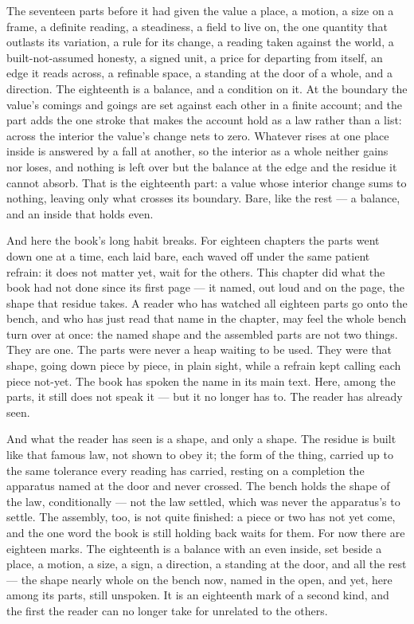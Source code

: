 The seventeen parts before it had given the value a place, a motion, a size on a frame, a definite reading, a steadiness, a field to live on, the one quantity that outlasts its variation, a rule for its change, a reading taken against the world, a built-not-assumed honesty, a signed unit, a price for departing from itself, an edge it reads across, a refinable space, a standing at the door of a whole, and a direction. The eighteenth is a balance, and a condition on it. At the boundary the value's comings and goings are set against each other in a finite account; and the part adds the one stroke that makes the account hold as a law rather than a list: across the interior the value's change nets to zero. Whatever rises at one place inside is answered by a fall at another, so the interior as a whole neither gains nor loses, and nothing is left over but the balance at the edge and the residue it cannot absorb. That is the eighteenth part: a value whose interior change sums to nothing, leaving only what crosses its boundary. Bare, like the rest --- a balance, and an inside that holds even.

And here the book's long habit breaks. For eighteen chapters the parts went down one at a time, each laid bare, each waved off under the same patient refrain: it does not matter yet, wait for the others. This chapter did what the book had not done since its first page --- it named, out loud and on the page, the shape that residue takes. A reader who has watched all eighteen parts go onto the bench, and who has just read that name in the chapter, may feel the whole bench turn over at once: the named shape and the assembled parts are not two things. They are one. The parts were never a heap waiting to be used. They were that shape, going down piece by piece, in plain sight, while a refrain kept calling each piece not-yet. The book has spoken the name in its main text. Here, among the parts, it still does not speak it --- but it no longer has to. The reader has already seen.

And what the reader has seen is a shape, and only a shape. The residue is built like that famous law, not shown to obey it; the form of the thing, carried up to the same tolerance every reading has carried, resting on a completion the apparatus named at the door and never crossed. The bench holds the shape of the law, conditionally --- not the law settled, which was never the apparatus's to settle. The assembly, too, is not quite finished: a piece or two has not yet come, and the one word the book is still holding back waits for them. For now there are eighteen marks. The eighteenth is a balance with an even inside, set beside a place, a motion, a size, a sign, a direction, a standing at the door, and all the rest --- the shape nearly whole on the bench now, named in the open, and yet, here among its parts, still unspoken. It is an eighteenth mark of a second kind, and the first the reader can no longer take for unrelated to the others.
